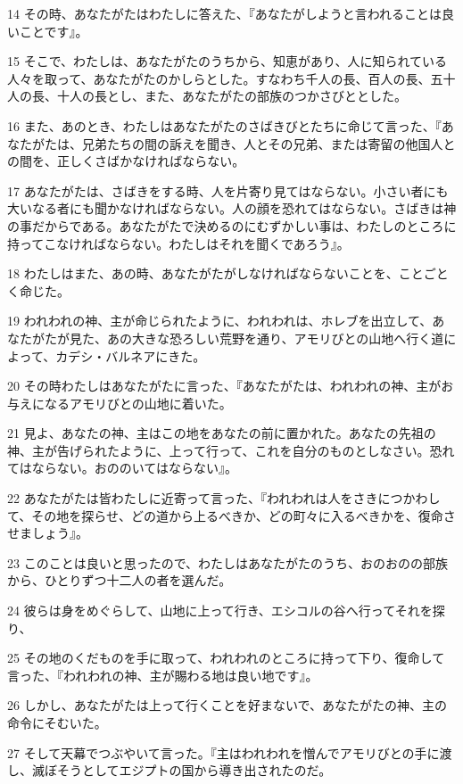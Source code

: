 \par 14 その時、あなたがたはわたしに答えた、『あなたがしようと言われることは良いことです』。
\par 15 そこで、わたしは、あなたがたのうちから、知恵があり、人に知られている人々を取って、あなたがたのかしらとした。すなわち千人の長、百人の長、五十人の長、十人の長とし、また、あなたがたの部族のつかさびととした。
\par 16 また、あのとき、わたしはあなたがたのさばきびとたちに命じて言った、『あなたがたは、兄弟たちの間の訴えを聞き、人とその兄弟、または寄留の他国人との間を、正しくさばかなければならない。
\par 17 あなたがたは、さばきをする時、人を片寄り見てはならない。小さい者にも大いなる者にも聞かなければならない。人の顔を恐れてはならない。さばきは神の事だからである。あなたがたで決めるのにむずかしい事は、わたしのところに持ってこなければならない。わたしはそれを聞くであろう』。
\par 18 わたしはまた、あの時、あなたがたがしなければならないことを、ことごとく命じた。
\par 19 われわれの神、主が命じられたように、われわれは、ホレブを出立して、あなたがたが見た、あの大きな恐ろしい荒野を通り、アモリびとの山地へ行く道によって、カデシ・バルネアにきた。
\par 20 その時わたしはあなたがたに言った、『あなたがたは、われわれの神、主がお与えになるアモリびとの山地に着いた。
\par 21 見よ、あなたの神、主はこの地をあなたの前に置かれた。あなたの先祖の神、主が告げられたように、上って行って、これを自分のものとしなさい。恐れてはならない。おののいてはならない』。
\par 22 あなたがたは皆わたしに近寄って言った、『われわれは人をさきにつかわして、その地を探らせ、どの道から上るべきか、どの町々に入るべきかを、復命させましょう』。
\par 23 このことは良いと思ったので、わたしはあなたがたのうち、おのおのの部族から、ひとりずつ十二人の者を選んだ。
\par 24 彼らは身をめぐらして、山地に上って行き、エシコルの谷へ行ってそれを探り、
\par 25 その地のくだものを手に取って、われわれのところに持って下り、復命して言った、『われわれの神、主が賜わる地は良い地です』。
\par 26 しかし、あなたがたは上って行くことを好まないで、あなたがたの神、主の命令にそむいた。
\par 27 そして天幕でつぶやいて言った。『主はわれわれを憎んでアモリびとの手に渡し、滅ぼそうとしてエジプトの国から導き出されたのだ。
